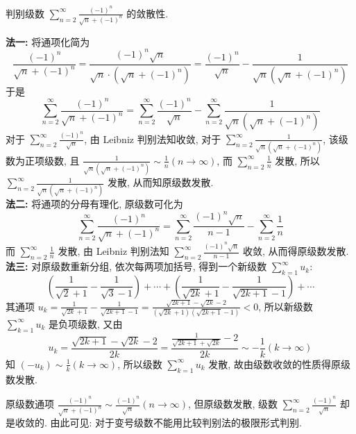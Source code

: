 \begin{example}
    判别级数 $\displaystyle  \sum_{n=2}^{\infty} \frac{(-1)^{n}}{\sqrt{n}+(-1)^{n}} $ 的敛散性.
\end{example}
\begin{solution}
    \textbf{法一: }将通项化简为
    $$\frac{(-1)^{n}}{\sqrt{n}+(-1)^{n}}=\frac{(-1)^{n} \sqrt{n}}{\sqrt{n} \cdot\left(\sqrt{n}+(-1)^{n}\right)}=\frac{(-1)^{n}}{\sqrt{n}}-\frac{1}{\sqrt{n}\left(\sqrt{n}+(-1)^{n}\right)}$$
    于是 $$\displaystyle  \sum_{n=2}^{\infty} \frac{(-1)^{n}}{\sqrt{n}+(-1)^{n}}=\sum_{n=2}^{\infty} \frac{(-1)^{n}}{\sqrt{n}}-\sum_{n=2}^{\infty} \frac{1}{\sqrt{n}\left(\sqrt{n}+(-1)^{n}\right)} $$
    对于 $\displaystyle  \sum_{n=2}^{\infty} \frac{(-1)^{n}}{\sqrt{n}} $, 由 Leibniz 判别法知收敛, 对于 $\displaystyle  \sum_{n=2}^{\infty} \frac{1}{\sqrt{n}\left(\sqrt{n}+(-1)^{n}\right)} $, 该级数为正项级数, 且 $\displaystyle  \frac{1}{\sqrt{n}\left(\sqrt{n}+(-1)^{n}\right)} \sim \frac{1}{n}(n \rightarrow \infty) $, 而 $\displaystyle  \sum_{n=2}^{\infty} \frac{1}{n} $ 发散, 所以 $\displaystyle  \sum_{n=2}^{\infty} \frac{1}{\sqrt{n}\left(\sqrt{n}+(-1)^{n}\right)} $ 发散, 从而知原级数发散.\\ 
    \textbf{法二: }将通项的分母有理化, 原级数可化为
    $$
    \sum_{n=2}^{\infty} \frac{(-1)^{n}}{\sqrt{n}+(-1)^{n}}=\sum_{n=2}^{\infty} \frac{(-1)^{n} \sqrt{n}}{n-1}-\sum_{n=2}^{\infty} \frac{1}{n} 
    $$
    而 $\displaystyle  \sum_{n=2}^{\infty} \frac{1}{n} $ 发散, 由 Leibniz 判别法知 $\displaystyle  \sum_{n=2}^{\infty} \frac{(-1)^{n} \sqrt{n}}{n-1} $ 收敛, 从而得原级数发散.\\ 
    \textbf{法三: }对原级数重新分组, 依次每两项加括号, 得到一个新级数 $\displaystyle  \sum_{k=1}^{\infty} u_{k} $:
    $$\left(\frac{1}{\sqrt{2}+1}-\frac{1}{\sqrt{3}-1}\right)+\cdots+\left(\frac{1}{\sqrt{2 k}+1}-\frac{1}{\sqrt{2 k+1}-1}\right)+\cdots$$
    其通项 $\displaystyle  u_{k}=\frac{1}{\sqrt{2 k}+1}-\frac{1}{\sqrt{2 k+1}-1}=\frac{\sqrt{2 k+1}-\sqrt{2 k}-2}{(\sqrt{2 k}+1)(\sqrt{2 k+1}-1)}<0 $, 所以新级数 $\displaystyle  \sum_{k=1}^{\infty} u_{k} $ 是负项级数, 又由
    $$
    u_{k}=\frac{\sqrt{2 k+1}-\sqrt{2 k}-2}{2 k}=\frac{\frac{1}{\sqrt{2 k+1}+\sqrt{2 k}}-2}{2 k} \sim-\frac{1}{k}(k \rightarrow \infty) 
    $$
    知 $\displaystyle  \left(-u_{k}\right) \sim \frac{1}{k}   (k \rightarrow \infty) $, 所以级数 $\displaystyle  \sum_{k=1}^{\infty} u_{k} $ 发散, 故由级数收敛的性质得原级数发散.
\end{solution}

原级数通项 $\displaystyle  \frac{(-1)^{n}}{\sqrt{n}+(-1)^{n}} \sim \frac{(-1)^{n}}{\sqrt{n}}(n \rightarrow \infty) $, 但原级数发散, 级数 $\displaystyle  \sum_{n=2}^{\infty} \frac{(-1)^{n}}{\sqrt{n}} $ 却是收敛的. 由此可见: 对于变号级数不能用比较判别法的极限形式判别.

